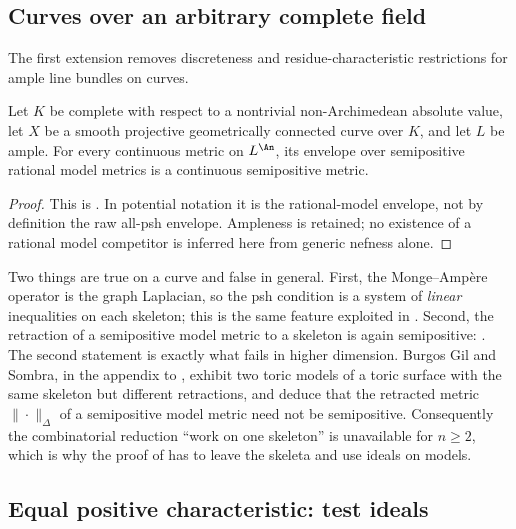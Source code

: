 \subsection{Curves over an arbitrary complete field}
\label{sec:ch23-later-curves}

The first extension removes discreteness and residue-characteristic
restrictions for ample line bundles on curves.

\begin{theorem}
\label{thm:ch23-gjkm-curves}
Let \(K\) be complete with respect to a nontrivial non-Archimedean
absolute value, let \(X\) be a smooth projective geometrically connected
curve over \(K\), and let \(L\) be ample.  For every continuous metric
on \(L^{\An}\), its envelope over semipositive rational model metrics
is a continuous semipositive metric.
\end{theorem}

\begin{proof}
This is \cite[Theorem~1.1]{GJKM19}.  In potential notation it is the
rational-model envelope, not by definition the raw all-psh envelope.
Ampleness is retained; no existence of a rational model competitor is
inferred here from generic nefness alone.
\end{proof}

\begin{remark}
\label{rem:ch23-curve-specialness}
Two things are true on a curve and false in general.  First, the
Monge--Amp\`ere operator is the graph Laplacian, so the psh condition is a
system of \emph{linear} inequalities on each skeleton; this is the same
feature exploited in .  Second, the
retraction of a semipositive model metric to a skeleton is again
semipositive: \cite[Proposition~1.2 and Propositions~3.5, 3.8]{GJKM19}.  The
second statement is exactly what fails in higher dimension.  Burgos Gil and
Sombra, in the appendix to \cite{GJKM19}, exhibit two toric models of a
toric surface with the same skeleton but different retractions, and deduce
that the retracted metric \(\|\cdot\|_\Delta\) of a semipositive model
metric need not be semipositive.  Consequently the combinatorial reduction
``work on one skeleton'' is unavailable for \(n\geq2\), which is why the
proof of  has to leave the skeleta and use
ideals on models.
\end{remark}

\subsection{Equal positive characteristic: test ideals}
\label{sec:ch23-later-test-ideals}

